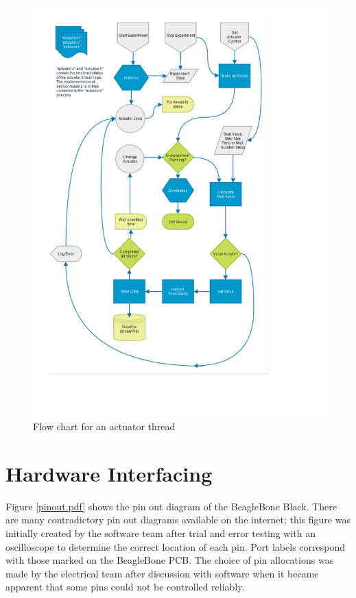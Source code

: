 \begin{figure}[H]
	\centering
	\includegraphics[width=1.1\textwidth]{figures/actuator_thread.pdf}
	\caption{Flow chart for an actuator thread} 
	\label{actuator_thread.pdf}
\end{figure}


\section{Hardware Interfacing}\label{Hardware}

Figure \ref{pinout.pdf} shows the pin out diagram of the BeagleBone Black. There are many contradictory pin out diagrams available on the internet; this figure was initially created by the software team after trial and error testing with an oscilloscope to determine the correct location of each pin. Port labels correspond with those marked on the BeagleBone PCB. The choice of pin allocations was made by the electrical team after discussion with software when it became apparent that some pins could not be controlled reliably.




